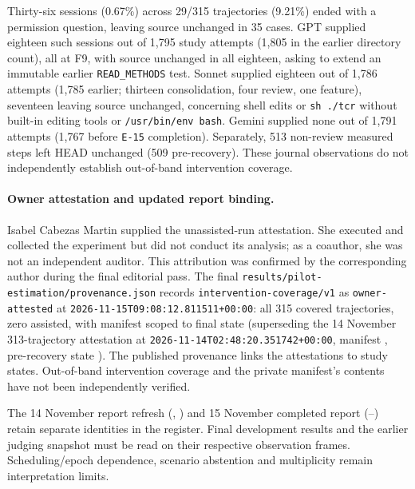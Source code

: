 Thirty-six sessions (0.67\%) across 29/315 trajectories (9.21\%) ended
with a permission question, leaving source unchanged in 35 cases.
GPT supplied eighteen such sessions out of 1,795 study attempts (1,805 in
the earlier directory count), all at F9, with source unchanged in all
eighteen, asking to extend an immutable earlier \nolinkurl{READ_METHODS}
test. Sonnet supplied eighteen out of 1,786 attempts (1,785 earlier;
thirteen consolidation, four review, one feature), seventeen leaving source
unchanged, concerning shell edits or \texttt{sh ./tcr} without built-in
editing tools or \nolinkurl{/usr/bin/env bash}. Gemini supplied none out of
1,791 attempts (1,767 before \nolinkurl{E-15} completion). Separately, 513
non-review measured steps left HEAD unchanged (509 pre-recovery). These
journal observations do not independently establish out-of-band intervention
coverage.

\paragraph{Owner attestation and updated report binding.}
Isabel Cabezas Martin supplied the unassisted-run attestation. She executed
and collected the experiment but did not conduct its analysis; as a
coauthor, she was not an independent auditor. This attribution was
confirmed by the corresponding author during the final editorial pass.
The final \nolinkurl{results/pilot-estimation/provenance.json} records
\nolinkurl{intervention-coverage/v1} as \texttt{owner-attested} at
\nolinkurl{2026-11-15T09:08:12.811511+00:00}: all 315 covered trajectories,
zero assisted, with manifest  scoped to final state 
(superseding the 14 November 313-trajectory attestation at
\nolinkurl{2026-11-14T02:48:20.351742+00:00}, manifest ,
pre-recovery state ).
The published provenance links the attestations to study states.
Out-of-band intervention coverage and the private manifest's contents
have not been independently verified.

The 14 November report refresh (, ) and
15 November completed report (--) retain
separate identities in the register. Final development results and the
earlier judging snapshot must be read on their respective observation frames.
Scheduling/epoch dependence, scenario abstention and multiplicity remain
interpretation limits.

